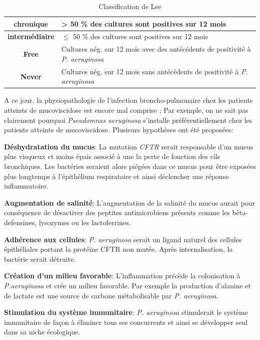 \documentclass[12pt,a4paper]{article}
\begin{document}
 \begin{table}[h]
     \centering
     \caption{Classification de Lee \cite{Lee2003}}
     \begin{tabular}{|c|p{10cm}|}
      \hline
          \textbf{chronique} & > 50 \% des cultures sont positives sur 12 mois \\
         \hline
         \textbf{intermédiaire} & $\leq$ 50 \% des cultures sont positives sur  12 mois\\
          \hline
          \textbf{Free} & Cultures nég. sur 12 mois avec des antécédents de positivité à \textit{P. aeruginosa}\\
         \hline
	    \textbf{Never} & Cultures nég. sur 12 mois sans antécédents de positivité à \textit{P. aeruginosa} \\
	      \hline
     \end{tabular}
     \label{lee}
 \end{table}


A ce jour, la physiopathologie de l'infection broncho-pulmonaire chez les patients atteints de mucoviscidose est encore mal comprise ; Par exemple, on ne sait pas clairement pourquoi \textit{Pseudomnas aeruginosa} s’installe préférentiellement chez les patients atteints de mucoviscidose. Plusieurs hypothèses ont été proposées:

\textbf{Déshydratation du mucus}\cite{Davies}:
La mutation \textit{CFTR} serait responsable d'un mucus plus visqueux et moins épais associé à une la perte de fonction des cils bronchiques. Les bactéries seraient alors piégées dans ce mucus pour être exposées plus longtemps à l'épithélium respiratoire et ainsi déclencher une réponse inflammatoire.

\textbf{Augmentation de salinité}\cite{Davies}:
L'augmentation de la salinité du mucus aurait pour conséquence de désactiver des peptites antimicrobiens présents comme les bêta-defensines, lysozymes ou les lactoferrines.

\textbf{Adhérence aux cellules}\cite{Davies}:
\textit{P. aeruginosa} serait un ligand naturel des cellules épithéliales portant la protéine CFTR non mutée. Après internalisation, la bactérie serait détruite.

\textbf{Création d'un milieu favorable}:
L'inflammation précède la colonisation à \textit{P.aeruginosa} et crée un milieu favorable.
Par exemple la production d'alanine et de lactate \cite{Boulette2009} est une source de carbone métabolisable par \textit{P. aeruginosa}.

\textbf{Stimulation du système immunitaire}:
\textit{P. aeruginosa} stimulerait le système immunitaire de façon à éliminer tous ses concurrents et ainsi se développer seul dans sa niche écologique.
\end{document}
